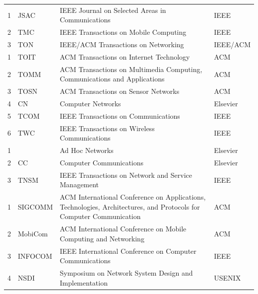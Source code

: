 \documentclass[doctor, vlined, ]{DissertUESTC}
\begin{document}
\begin{longtable}{m{2em}<{\centering} p{4.5em} p{15em} p{6em}}
		1 & JSAC & IEEE Journal on Selected Areas in Communications & IEEE \\
		2 & TMC & IEEE Transactions on Mobile Computing & IEEE \\
		3 & TON & IEEE/ACM Transactions on Networking & IEEE/ACM \\
		1 & TOIT & ACM Transactions on Internet Technology & ACM \\
		2 & TOMM & ACM Transactions on Multimedia Computing, Communications and Applications & ACM \\
		3 & TOSN & ACM Transactions on Sensor Networks & ACM \\
		4 & CN & Computer Networks & Elsevier \\
		5 & TCOM & IEEE Transactions on Communications & IEEE \\
		6 & TWC & IEEE Transactions on Wireless Communications & IEEE \\
		1 & & Ad Hoc Networks & Elsevier \\
		2 & CC & Computer Communications & Elsevier\tablenoteref{tn: 手动跨页表格附注标签Elsevier} \\
		3 & TNSM & IEEE Transactions on Network and Service Management & IEEE \\
		1 & SIGCOMM & ACM International Conference on Applications, Technologies, Architectures, and Protocols for Computer Communication & ACM \\
		2 & MobiCom & ACM International Conference on Mobile Computing and Networking & ACM \\
		3 & INFOCOM & IEEE International Conference on Computer Communications & IEEE \\
		4 & NSDI & Symposium on Network System Design and Implementation & USENIX\tablenoteref{tn: 手动跨页表格附注标签USENIX} \\

\end{longtable}
\end{document}
